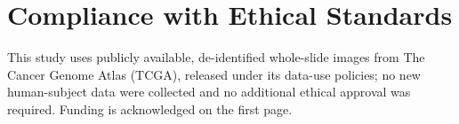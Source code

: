 \documentclass{article}
\begin{document}
\section*{Compliance with Ethical Standards}
This study uses publicly available, de-identified whole-slide images from The Cancer Genome Atlas (TCGA), released under its data-use policies; no new human-subject data were collected and no additional ethical approval was required. Funding is acknowledged on the first page.



\end{document}
